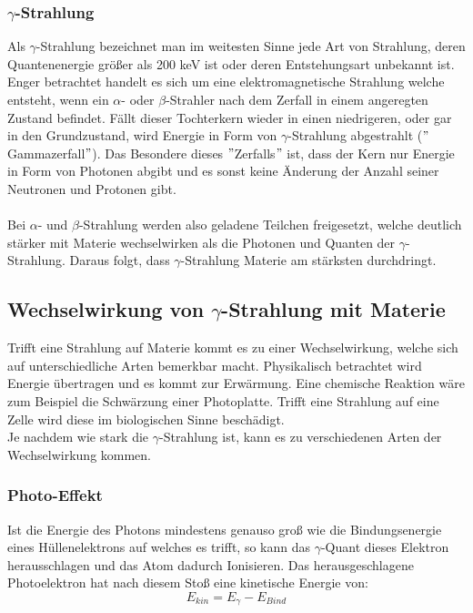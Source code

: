	\subsubsection*{$\gamma$-Strahlung}
	Als $\gamma$-Strahlung bezeichnet man im weitesten Sinne jede Art von Strahlung, deren Quantenenergie größer als 200 keV ist oder deren Entstehungsart unbekannt ist. Enger betrachtet handelt es sich um eine elektromagnetische Strahlung welche entsteht, wenn ein $\alpha$- oder $\beta$-Strahler nach dem Zerfall in einem angeregten Zustand befindet. Fällt dieser Tochterkern wieder in einen niedrigeren, oder gar in den Grundzustand, wird Energie in Form von $\gamma$-Strahlung abgestrahlt ($"$Gammazerfall$"$). Das Besondere dieses $"$Zerfalls$"$ ist, dass der Kern nur Energie in Form von Photonen abgibt und es sonst keine Änderung der Anzahl seiner Neutronen und Protonen gibt.\\
\\
	Bei $\alpha$- und $\beta$-Strahlung werden also geladene Teilchen freigesetzt, welche deutlich stärker mit Materie wechselwirken als die Photonen und Quanten der $\gamma$-Strahlung. Daraus folgt, dass $\gamma$-Strahlung Materie am stärksten durchdringt.

\subsection{Wechselwirkung von $\gamma$-Strahlung mit Materie}
Trifft eine Strahlung auf Materie kommt es zu einer Wechselwirkung, welche sich auf unterschiedliche Arten bemerkbar macht. Physikalisch betrachtet wird Energie übertragen und es kommt zur Erwärmung. Eine chemische Reaktion wäre zum Beispiel die Schwärzung einer Photoplatte. Trifft eine Strahlung auf eine Zelle wird diese im biologischen Sinne beschädigt.\\
Je nachdem wie stark die $\gamma$-Strahlung ist, kann es zu verschiedenen Arten der Wechselwirkung kommen.

\subsubsection*{Photo-Effekt}
Ist die Energie des Photons mindestens genauso groß wie die Bindungsenergie eines Hüllenelektrons auf welches es trifft, so kann das $\gamma$-Quant dieses Elektron herausschlagen und das Atom dadurch Ionisieren. Das herausgeschlagene Photoelektron hat nach diesem Stoß eine kinetische Energie von:
	\begin{equation}
	E_{kin} = E_{\gamma}-E_{Bind}
	\end{equation}

